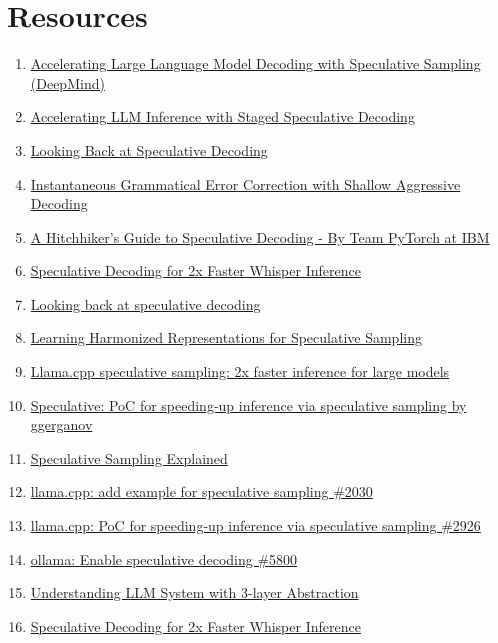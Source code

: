 \documentclass[draft,a4paper,12pt]{report}
\begin{document}
\section*{Resources}
\begin{enumerate}
    \item \href{https://arxiv.org/abs/2302.01318}{Accelerating Large Language Model Decoding with Speculative Sampling (DeepMind)}
    \item \href{https://arxiv.org/abs/2308.04623}{Accelerating LLM Inference with Staged Speculative Decoding}
    \item \href{https://news.ycombinator.com/item?id=43216518}{Looking Back at Speculative Decoding}
    \item \href{https://arxiv.org/abs/2106.04970}{Instantaneous Grammatical Error Correction with Shallow Aggressive Decoding}
    \item \href{https://pytorch.org/blog/hitchhikers-guide-speculative-decoding/}{A Hitchhiker’s Guide to Speculative Decoding - By Team PyTorch at IBM}
    \item \href{https://colab.research.google.com/github/sanchit-gandhi/notebooks/blob/main/speculative_decoding.ipynb#scrollTo=baf87589-b7fe-45dd-a6f6-9b9223581562}{Speculative Decoding for 2x Faster Whisper Inference}
    \item \href{https://research.google/blog/looking-back-at-speculative-decoding/}{Looking back at speculative decoding}
    \item \href{https://arxiv.org/abs/2408.15766}{Learning Harmonized Representations for Speculative Sampling}
    \item \href{https://news.ycombinator.com/item?id=37390024}{Llama.cpp speculative sampling: 2x faster inference for large models}
    \item \href{https://news.ycombinator.com/item?id=37357783}{Speculative: PoC for speeding-up inference via speculative sampling by ggerganov}
    \item \href{https://saibo-creator.github.io/post/2024_03_08_speculative_sampling/}{Speculative Sampling Explained}
    \item \href{https://github.com/ggml-org/llama.cpp/issues/2030}{llama.cpp: add example for speculative sampling \#2030}
    \item \href{https://github.com/ggml-org/llama.cpp/pull/2926}{llama.cpp: PoC for speeding-up inference via speculative sampling \#2926}
    \item \href{https://github.com/ollama/ollama/issues/5800}{ollama: Enable speculative decoding \#5800}
    \item \href{https://ralphmao.github.io/ML-software-system/}{Understanding LLM System with 3-layer Abstraction}
    \item \href{https://huggingface.co/blog/whisper-speculative-decoding}{Speculative Decoding for 2x Faster Whisper Inference}
\end{enumerate}
\end{document}

